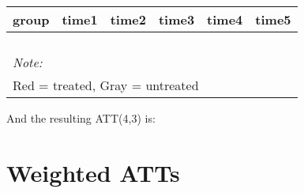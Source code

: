 \documentclass[
]{article}
\begin{document}
\begin{table}
\centering
\begin{tabular}[t]{>{}r|>{}r|>{}r|>{}r|>{}r|>{}r}
\hline
group & time1 & time2 & time3 & time4 & time5\\
\hline
\cellcolor{white}{2} & \cellcolor{white}{0.631} & \cellcolor{white}{0.711} & \cellcolor{white}{\textcolor{black}{0.814}} & \cellcolor{white}{\textcolor{black}{0.846}} & \cellcolor{white}{0.826}\\
\hline
\cellcolor{white}{3} & \cellcolor{white}{0.678} & \cellcolor{white}{0.770} & \cellcolor{white}{\textcolor{black}{0.664}} & \cellcolor{white}{\textcolor{black}{0.800}} & \cellcolor{white}{0.784}\\
\hline
\cellcolor{white}{4} & \cellcolor{white}{0.778} & \cellcolor{white}{0.807} & \cellcolor{red}{\textcolor{black}{0.673}} & \cellcolor{red}{\textcolor{black}{0.750}} & \cellcolor{white}{0.868}\\
\hline
\cellcolor{white}{5} & \cellcolor{white}{0.854} & \cellcolor{white}{0.939} & \cellcolor{lightgray}{\textcolor{black}{0.854}} & \cellcolor{lightgray}{\textcolor{black}{0.800}} & \cellcolor{white}{0.855}\\
\hline
\multicolumn{6}{l}{\rule{0pt}{1em}\textit{Note: }}\\
\multicolumn{6}{l}{\rule{0pt}{1em}Red = treated, Gray = untreated}\\
\end{tabular}
\end{table}

And the resulting ATT(4,3) is:

\hypertarget{weighted-atts}{%
\section{Weighted ATTs}\label{weighted-atts}}
\end{document}
